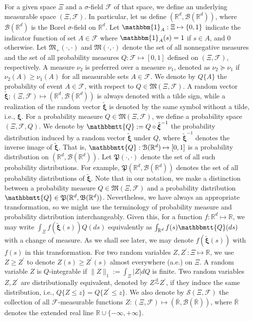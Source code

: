 \documentclass[final,onefignum,onetabnum]{class}
\newcommand{\bs}[1]{\boldsymbol{#1}} %
\newcommand{\Bs}[1]{\mathbb{#1}} %
\newcommand{\Ts}[1]{\mathbbmtt{#1}} %
\newcommand{\Cs}[1]{\mathcal{#1}} %
\newcommand{\Fs}[1]{\mathfrak{#1}} %
\newcommand{\txi}{\tilde{\bs{\xi}}}
\newcommand{\ol}[1]{\overline{#1}}
\newcommand{\measurespace}{\left( \Xi, \Cs{F} \right)}
\newcommand{\Pspace}[1]{\left( \Xi, \Cs{F}, #1 \right)}
\renewcommand{\P}{\Fs{P}(\Bs{R}^{d},\Fs{B}(\Bs{R}^{d}))}
\begin{document}
For a given space $\Xi$ and a  $\sigma$-field $\Cs{F}$ of that space, we define an underlying measurable space $\measurespace$. In particular, let us define  $(\Bs{R}^{d}, \Cs{B}(\Bs{R}^{d}))$, where $\Cs{B}(\Bs{R}^{d})$ is the Borel $\sigma$-field on $\Bs{R}^{d}$. 
Let $\mathbbm{1}_{A}: \Xi \mapsto \{0,1\}$ indicate the indicator function of set  $A \in \Cs{F}$ where $\mathbbm{1}_{A}(s)=1$ if $s \in A$, and 0 otherwise.    Let $\Fs{M}_{+}(\cdot,\cdot)$ and $\Fs{M}(\cdot,\cdot)$ denote the set of all nonnegative measures and the set of all probability measures $Q: \Cs{F} \mapsto [0,1]$ defined on $\measurespace$, respectively. A measure $\nu_{2}$ is preferred over a measure $\nu_{1}$, denoted as $\nu_{2}  \succeq \nu_{1}$ if $\nu_{2}(A) \ge \nu_{1}(A)$ for all measurable sets $A \in \Cs{F}$. 
We denote by $Q\{A\}$ the probability of event $A \in \Cs{F}$, with respect to $Q \in \Fs{M}\measurespace$.
A random vector $\txi: \measurespace \mapsto (\Bs{R}^{d}, \Cs{B}(\Bs{R}^{d}))$ is always denoted with a tilde sign, while a realization of the random vector $\txi$ is denoted by the same symbol without a tilde, i.e., $\bs{\xi}$. 
For a probability measure $Q \in \Fs{M}\measurespace$, we define a probability space $\Pspace{Q}$. We denote  by $\Ts{Q}:=Q \circ \txi^{-1}$ the probability distribution induced by a random vector $\txi$ under $Q$, where $\txi^{-1}$ denotes the inverse image of $\txi$.  That is, $\Ts{Q} : \Cs{B}(\Bs{R}^{d}) \mapsto [0,1]$ is a probability distribution on $(\Bs{R}^{d}, \Cs{B}(\Bs{R}^{d}))$. 
Let  $\Fs{P}(\cdot,\cdot)$ denote the set of all such probability distributions. For example, $\Fs{P}(\Bs{R}^{d}, \Cs{B}(\Bs{R}^{d}))$ denotes the set of all probability distributions of $\txi$. %
Note that in our notation, we make a distinction between a probability measure $Q \in  \Fs{M}\measurespace$  and a  probability distribution $\Ts{Q} \in \P$.  Nevertheless, we  have always an appropriate transformation, so we might use the terminology of probability measure and probability distribution interchangeably.  Given this, for a function $f: \Bs{R}^{d} \mapsto \Bs{R}$, we may write  $\int_{\Xi} f(\txi(s)) Q(ds)$ equivalently as $\int_{\Bs{R}^{d}} f(s) \Ts{Q}(ds)$ with a change of measure. As we shall see later, we may denote $f(\txi(s))$ with $f(s)$ in this transformation. 
For two random variables $Z, Z^{\prime}: \Xi \mapsto \Bs{R}$, we use $Z \ge Z^{\prime}$ to denote $Z(s) \ge Z^{\prime}(s) $ almost everywhere (a.e.) on $\Xi$.  
A random variable $Z$ is $Q$-integrable if $ \|Z\|_{1}:=\int_{\Xi} |Z| d Q$ is finite. 
Two random variables $Z, Z^{\prime}$ are distributionally equivalent, denoted by $Z \overset{\text{d}}{\sim} Z^{\prime}$, if  they induce the same distribution, i.e., $Q\{Z \le z\}=Q\{Z^{\prime} \le z\}$. 
We also denote by $\Cs{S}(\Xi, \Cs{F})$ the collection of all $\Cs{F}$-measurable functions $Z: \measurespace \mapsto (\ol{\Bs{R}}, \Cs{B}(\overline{\Bs{R}}))$, where $\ol{\Bs{R}}$ denotes the extended real line $\Bs{R} \cup \{-\infty, +\infty\}$. 
\end{document}
